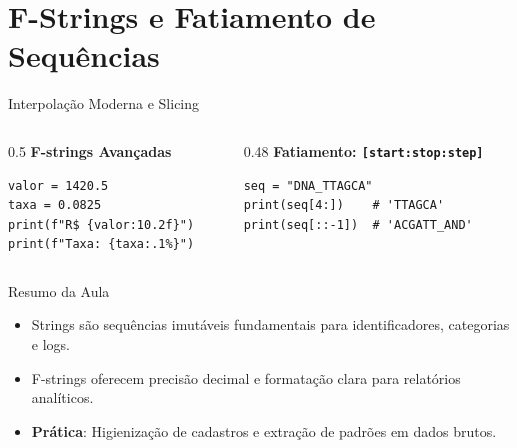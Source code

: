 \documentclass[aspectratio=169, 10pt]{beamer}
\begin{document}
\section{F-Strings e Fatiamento de Sequências}

\begin{frame}[fragile]{Interpolação Moderna e Slicing}
  \begin{columns}
    \begin{column}{0.5\textwidth}
      \textbf{F-strings Avançadas}
      \begin{lstlisting}
valor = 1420.5
taxa = 0.0825
print(f"R$ {valor:10.2f}")
print(f"Taxa: {taxa:.1%}")
      \end{lstlisting}
    \end{column}
    \begin{column}{0.48\textwidth}
      \textbf{Fatiamento: \texttt{[start:stop:step]}}
      \begin{lstlisting}
seq = "DNA_TTAGCA"
print(seq[4:])    # 'TTAGCA'
print(seq[::-1])  # 'ACGATT_AND'
      \end{lstlisting}
    \end{column}
  \end{columns}
\end{frame}

\begin{frame}{Resumo da Aula}
  \begin{itemize}
    \item Strings são sequências imutáveis fundamentais para identificadores, categorias e logs.
    \item F-strings oferecem precisão decimal e formatação clara para relatórios analíticos.
    \item \textbf{Prática}: Higienização de cadastros e extração de padrões em dados brutos.
  \end{itemize}
\end{frame}
\end{document}
